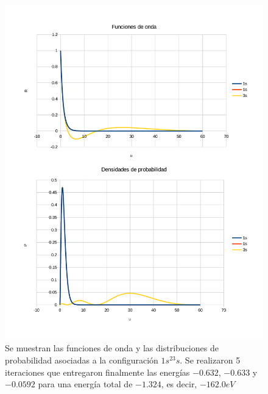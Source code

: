 \documentclass[a4paper]{article}
\begin{document}
\begin{figure}
\begin{center}
\includegraphics[width = \textwidth]{1s_1s_3s.pdf}
\caption{\label{fig:3s}Se muestran las funciones de onda y las distribuciones de probabilidad asociadas a la configuración $1s^23s$. Se realizaron 5 iteraciones que entregaron finalmente las energías $-0.632$, $-0.633$ y $-0.0592$ para una energía total de $-1.324$, es decir, $-162.0eV$}
\end{center}
\end{figure}
\end{document}
